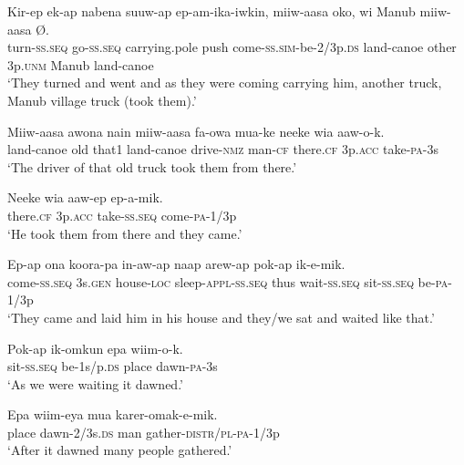 {\ea\label{ex:a:x46}
\gll  Kir-ep  ek-ap  nabena  suuw-ap  ep-am-ika-iwkin,                miiw-aasa  oko,  wi  Manub  miiw-aasa  Ø. \\
turn-\textsc{ss.seq}  go-\textsc{ss.seq}  carrying.pole  push  come-\textsc{ss}.\textsc{sim}-be-2/3p.\textsc{ds}   land-canoe  other  3p.\textsc{unm}  Manub  land-canoe \\


\glt ‘They turned and went and as they were coming carrying him, another truck, Manub village truck (took them).’ \\
\z


\ea\label{ex:a:x47}
\gll  Miiw-aasa  awona  nain  miiw-aasa  fa-owa  mua-ke  neeke   wia  aaw-o-k. \\
land-canoe  old  that1  land-canoe  drive-\textsc{nmz}  man-\textsc{cf}  there.\textsc{cf}  3p.\textsc{acc}  take-\textsc{pa}-3s \\


\glt ‘The driver of that old truck took them from there.’ \\
\z


\ea\label{ex:a:x48}
\gll  Neeke  wia  aaw-ep  ep-a-mik. \\
there.\textsc{cf}  3p.\textsc{acc}  take-\textsc{ss.seq}  come-\textsc{pa}-1/3p \\
\glt ‘He took them from there and they came.’ \\
\z


\ea\label{ex:a:x49}
\gll  Ep-ap  ona  koora-pa  in-aw-ap  naap              arew-ap  pok-ap  ik-e-mik. \\
come-\textsc{ss.seq}  3s.\textsc{gen}  house-\textsc{loc}  sleep-\textsc{appl}-\textsc{ss.seq}  thus wait-\textsc{ss.seq}  sit-\textsc{ss.seq}  be-\textsc{pa}-1/3p \\


\glt ‘They came and laid him in his house and they/we sat and waited like that.’ \\
\z


\ea\label{ex:a:x50}
\gll  Pok-ap  ik-omkun  epa  wiim-o-k. \\
sit-\textsc{ss.seq}  be-1s/p.\textsc{ds}  place  dawn-\textsc{pa}-3s \\
\glt ‘As we were waiting it dawned.’ \\
\z


\ea\label{ex:a:x51}
\gll  Epa  wiim-eya  mua  karer-omak-e-mik. \\
place  dawn-2/3s.\textsc{ds}  man  gather-\textsc{distr}/\textsc{pl}-\textsc{pa}-1/3p \\
\glt ‘After it dawned many people gathered.’ \\
\z


}
